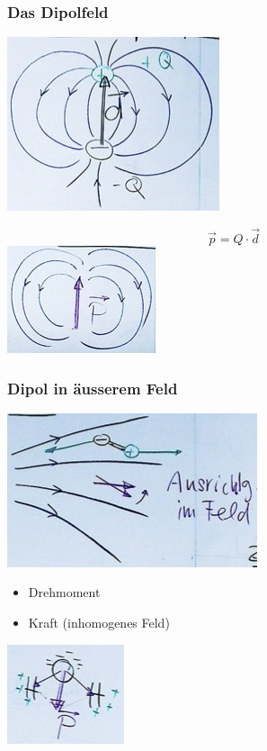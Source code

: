 \subsubsection{Das Dipolfeld}
\includegraphics{Bild153}
\begin{def*}[ note = Dipolmoment , index = Dipolmoment ]
	\[ \boxed{ \vec{p} = Q \cdot \vec{d} } \]
	\includegraphics{Bild154}
\end{def*}

\subsubsection{Dipol in äusserem Feld}
\includegraphics{Bild155} \\
\begin{itemize}
	\item Drehmoment
	\item Kraft (inhomogenes Feld)
\end{itemize}
\begin{bsp*}[ head = z.B. , note = \ce{H2O}-Molekül ]
	\includegraphics{Bild156}
\end{bsp*}

